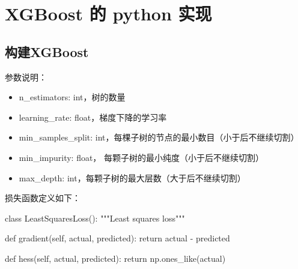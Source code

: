 \documentclass[12pt]{article}
\begin{document}
\section{XGBoost 的 python 实现\cite{XGBoost_In_Python}}
\subsection{构建XGBoost}
参数说明：
\begin{itemize}
\setlength{\itemsep}{0pt}
\setlength{\parsep}{0pt}
\setlength{\parskip}{0pt}
    \item n\_estimators: int，树的数量
    \item learning\_rate: float，梯度下降的学习率
    \item min\_samples\_split: int，每棵子树的节点的最小数目（小于后不继续切割）
    \item min\_impurity: float， 每颗子树的最小纯度（小于后不继续切割）
    \item max\_depth: int，每颗子树的最大层数（大于后不继续切割）
\end{itemize}

损失函数定义如下：
\begin{python}
class LeastSquaresLoss():
    """Least squares loss"""

    def gradient(self, actual, predicted):
        return actual - predicted

    def hess(self, actual, predicted):
        return np.ones_like(actual)
\end{python}
\end{document}
